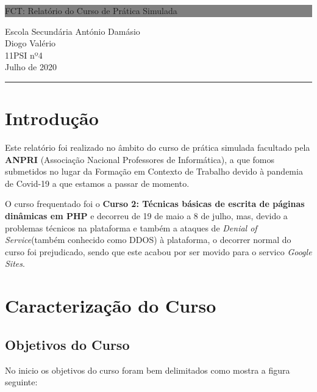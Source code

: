 \documentclass[12pt]{article}
\begin{document}
\begin{titlepage}

	\colorbox{grey}{
		\parbox[t]{0.93\textwidth}{ %
			\parbox[t]{0.91\textwidth}{ %
				\raggedleft
				\fontsize{50pt}{80pt}\selectfont
				\vspace{0.5cm}

				FCT: Relatório do Curso de Prática Simulada\\


				\vspace{0.5cm}
			}
		}
	}
	\vfill

	\parbox[t]{0.93\textwidth}{
		\raggedleft
		\large
		{\Large
    Escola Secundária António Damásio\\[4pt]
    Diogo Valério}\\[4pt]
		11PSI nº4\\
    Julho de 2020\\[4pt]
		\hfill\rule{0.6\linewidth}{1pt}
	}
\end{titlepage}


\tableofcontents
\newpage

\section{Introdução}
Este relatório foi realizado no âmbito do curso de prática simulada facultado pela \textbf{ANPRI} (Associação Nacional Professores de Informática), a que fomos submetidos no lugar da Formação em Contexto de Trabalho devido à pandemia de Covid-19 a que estamos a passar de momento.

O curso frequentado foi o \textbf{Curso 2: Técnicas básicas de escrita de páginas dinâmicas em PHP} e decorreu de 19 de maio a 8 de julho, mas, devido a problemas técnicos na plataforma e também a ataques de  \textit{Denial of Service}(também conhecido como DDOS) à plataforma, o decorrer normal do curso foi prejudicado, sendo que este acabou por ser movido para o servico \textit{Google Sites}.


\section{Caracterização do Curso}
\subsection{Objetivos do Curso}
No inicio os objetivos do curso foram bem delimitados como mostra a figura seguinte:
\end{document}
